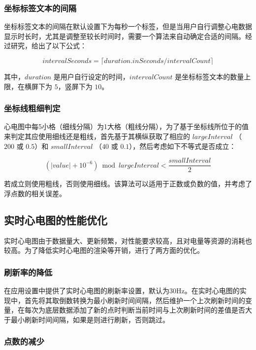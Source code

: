 \subsubsection{坐标标签文本的间隔}\label{subsubsec:label-interval}

坐标标签文本的间隔在默认设置下为每秒一个标签，但是当用户自行调整心电数据显示时长时，尤其是调整至较长时间时，需要一个算法来自动确定合适的间隔。经过研究，给出了以下公式：

\[
    intervalSeconds = \lceil duration.inSeconds / intervalCount \rceil
\]

其中，\(duration\) 是用户自行设定的时间，\(intervalCount\) 是坐标标签文本的数量上限，在横屏下为 \(5\)，竖屏下为 \(10\)。

\subsubsection{坐标线粗细判定}

心电图中每5小格（细线分隔）为1大格（粗线分隔），为了基于坐标线所位于的值来判定其应使用细线还是粗线，首先基于其横纵获取了相应的 \(largeInterval\) （\(200\) 或 \(0.5\)）和 \(smallInterval\) （\(40\) 或 \(0.1\)），然后考虑如下不等式是否成立：

\[
    (\lvert value \rvert + 10^{-6}) \bmod largeInterval < \frac{smallInterval}{2}
\]

若成立则使用粗线，否则使用细线。该算法可以适用于正数或负数的值，并考虑了浮点数的相关误差。

\subsection{实时心电图的性能优化}\label{subsec:ecg-performance}

实时心电图由于数据量大、更新频繁，对性能要求较高，且对电量等资源的消耗也较高。为了降低实时心电图的渲染等开销，进行了两方面的优化。

\subsubsection{刷新率的降低}

在应用设置中提供了实时心电图的刷新率设置，默认为30Hz。在实时心电图的实现中，首先将其取倒数转换为最小刷新时间间隔，然后维护一个上次刷新时间的变量，在每次为底层数据添加了新的点时判断当前时间与上次刷新时间的差值是否大于最小刷新时间间隔，如果是则进行刷新，否则跳过。

\subsubsection{点数的减少}\label{subsubsec:less-points}


